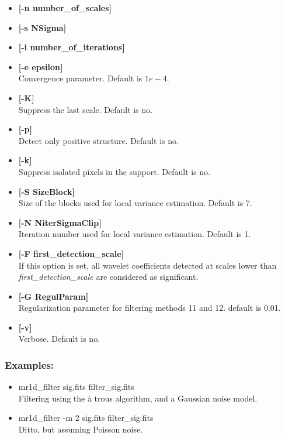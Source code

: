 \begin{itemize}
Epsilon = precision for computing thresholds
(only used in case of poisson noise with few events).
Default is $1e-03$.
\item {\bf [-n number\_of\_scales]} 
\item {\bf [-s NSigma]} 
\item {\bf [-i number\_of\_iterations]} 
\item {\bf [-e epsilon]}  \\
Convergence parameter. Default is $1e-4$.
\item {\bf [-K]}  \\
Suppress the last scale. Default is no.
\item {\bf [-p]}  \\
Detect only positive structure. Default is no.
\item {\bf [-k]}  \\
Suppress isolated pixels in the support. Default is no.
\item {\bf [-S SizeBlock]} \\
Size of the  blocks used for local variance estimation. Default is 7.
\item {\bf [-N NiterSigmaClip]} \\
Iteration number used for local variance estimation. Default is 1.
\item {\bf [-F first\_detection\_scale]} \\
If this option is set, all wavelet coefficients detected at scales lower 
than {\em first\_detection\_scale} are considered as significant.
\item {\bf [-G RegulParam]} \\
Regularization parameter for filtering methods 11 and 12. default is 0.01.
\item {\bf [-v]}  \\
Verbose. Default is no.
\end{itemize}

\subsubsection*{Examples:}
\begin{itemize}
\item mr1d\_filter sig.fits filter\_sig.fits \\
Filtering using the \`a trous algorithm, and a Gaussian noise model.
\item mr1d\_filter -m 2 sig.fits filter\_sig.fits   \\
Ditto, but assuming Poisson noise.
\end{itemize}



